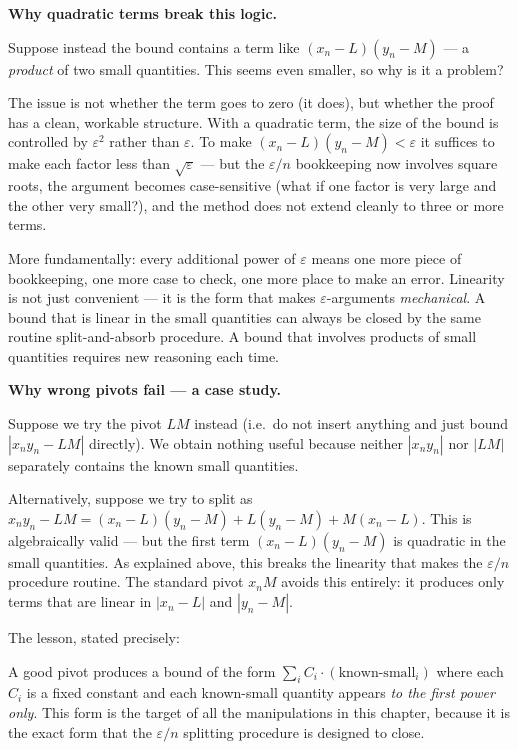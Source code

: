 \medskip

\noindent\textbf{Why quadratic terms break this logic.}

Suppose instead the bound contains a term like
$(x_n - L)(y_n - M)$ — a \emph{product} of two small quantities.
This seems even smaller, so why is it a problem?

The issue is not whether the term goes to zero (it does),
but whether the proof has a clean, workable structure.
With a quadratic term, the size of the bound is controlled by
$\varepsilon^2$ rather than $\varepsilon$.
To make $(x_n - L)(y_n - M) < \varepsilon$ it suffices to make
each factor less than $\sqrt{\varepsilon}$ — but the $\varepsilon/n$
bookkeeping now involves square roots, the argument becomes
case-sensitive (what if one factor is very large and the other very
small?), and the method does not extend cleanly to three or more terms.

More fundamentally: every additional power of $\varepsilon$ means
one more piece of bookkeeping, one more case to check, one more
place to make an error.
Linearity is not just convenient — it is the form that makes
$\varepsilon$-arguments \emph{mechanical}.
A bound that is linear in the small quantities can always be closed
by the same routine split-and-absorb procedure.
A bound that involves products of small quantities requires
new reasoning each time.

\medskip

\noindent\textbf{Why wrong pivots fail — a case study.}

Suppose we try the pivot $LM$ instead (i.e.\ do not insert anything
and just bound $|x_n y_n - LM|$ directly).
We obtain nothing useful because neither $|x_n y_n|$ nor $|LM|$
separately contains the known small quantities.

Alternatively, suppose we try to split as
$x_n y_n - LM = (x_n - L)(y_n - M) + L(y_n - M) + M(x_n - L)$.
This is algebraically valid — but the first term
$(x_n - L)(y_n - M)$ is quadratic in the small quantities.
As explained above, this breaks the linearity that makes the
$\varepsilon/n$ procedure routine.
The standard pivot $x_n M$ avoids this entirely: it produces only
terms that are linear in $|x_n - L|$ and $|y_n - M|$.

\medskip

The lesson, stated precisely:
\begin{tcolorbox}[colback=gray!6, colframe=gray!40, arc=2pt,
  left=8pt, right=8pt, top=6pt, bottom=6pt]
A good pivot produces a bound of the form
$\sum_i C_i \cdot (\text{known-small}_i)$
where each $C_i$ is a fixed constant and each known-small quantity
appears \emph{to the first power only}.
This form is the target of all the manipulations in this chapter,
because it is the exact form that the $\varepsilon/n$ splitting
procedure is designed to close.
\end{tcolorbox}

